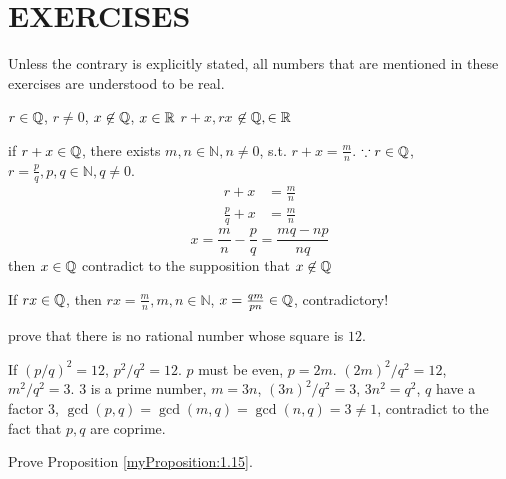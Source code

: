 \section*{EXERCISES}

Unless the contrary is explicitly stated, all numbers that are mentioned in these exercises are understood to be real.

\begin{myExercise}
    $r \in {\protect\mathbb Q} $, $r \neq 0$, $x \not\in {\protect\mathbb Q} $, $x \in {\protect\mathbb R}$
    $r+x, rx$ $\not\in {\protect\mathbb Q} , \in {\protect\mathbb R}$
\end{myExercise}

\mySolve
    if $r+x \in {\protect\mathbb Q} $, there exists $m, n \in \mathbb{N}, n \neq 0$, s.t. $r+x = \frac{m}{n}$.
    $\because r\in {\protect\mathbb Q} $, $r = \frac{p}{q}, p,q \in \mathbb{N}, q \neq 0$.
    \begin{align*}
        r + x &= \frac{m}{n}\\
        \frac{p}{q} + x &= \frac{m}{n}
    \end{align*}
    \begin{equation*}
        x = \frac{m}{n} - \frac{p}{q} = \frac{mq-np}{nq}
    \end{equation*}
    then $x \in {\protect\mathbb Q} $ contradict to the supposition that $x \not\in {\protect\mathbb Q} $

    If $rx \in {\protect\mathbb Q} $, then $rx = \frac{m}{n}, m,n\in \mathbb{N}$, $x = \frac{qm}{pn} \in {\protect\mathbb Q} $, contradictory!



\begin{myExercise}
   prove that there is no rational number whose square is $12$. 
\end{myExercise}

\mySolve
    If $\left(p/q\right)^2 = 12$, $p^2/q^2 = 12$. $p$ must be even, $p = 2m$.
    $(2m)^2/q^2 = 12$, $m^2/q^2=3$. 
    $3$ is a prime number, $m = 3n$, $(3n)^2/q^2 = 3$, $3n^2 = q^2$, $q$ have a factor $3$,
    $\gcd(p,q) = \gcd(m,q) = \gcd(n,q) = 3 \neq 1$, contradict to the fact that $p,q$ are coprime.


\begin{myExercise}
    Prove Proposition \ref{myProposition:1.15}.
\end{myExercise}

